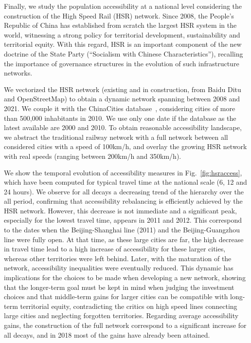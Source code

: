 


Finally, we study the population accessibility at a national level considering the construction of the High Speed Rail (HSR) network. Since 2008, the People's Republic of China has established from scratch the largest HSR system in the world, witnessing a strong policy for territorial development, sustainability and territorial equity. With this regard, HSR is an important component of the new doctrine of the State Party (``Socialism with Chinese Characteristics''), recalling the importance of governance structures in the evolution of such infrastructure networks.

We vectorized the HSR network (existing and in construction, from Baidu Ditu and OpenStreetMap) to obtain a dynamic network spanning between 2008 and 2021. We couple it with the ChinaCities database~\citep{swerts2017database}, considering cities of more than 500,000 inhabitants in 2010. We use only one date if the database as the latest available are 2000 and 2010. To obtain reasonable accessibility landscape, we abstract the traditional railway network with a full network between all considered cities with a speed of 100km/h, and overlay the growing HSR network with real speeds (ranging between 200km/h and 350km/h).

We show the temporal evolution of accessibility measures in Fig.~\ref{fig:hsraccess}, which have been computed for typical travel time at the national scale (6, 12 and 24 hours). We observe for all decays a decreasing trend of the hierarchy over the all period, confirming that accessibility rebalancing is efficiently achieved by the HSR network. However, this decrease is not immediate and a significant peak, especially for the lowest travel time, appears in 2011 and 2012. This correspond to the dates when the Beijing-Shanghai line (2011) and the Beijing-Guangzhou line were fully open. At that time, as these large cities are far, the high decrease in travel time lead to a high increase of accessibility for these larger cities, whereas other territories were left behind. Later, with the maturation of the network, accessibility inequalities were eventually reduced. This dynamic has implications for the choices to be made when developing a new network, showing that the longer-term goal must be kept in mind when judging the investment choices and that middle-term gains for larger cities can be compatible with long-term territorial equity, contradicting the critics on high speed lines connecting large cities and neglecting forgotten territories. Regarding average accessibility gains, the construction of the full network correspond to a significant increase for all decays, and in 2018 most of the gains have already been attained.


